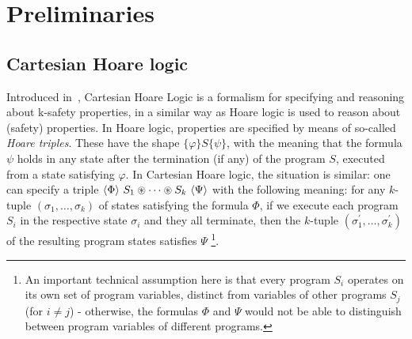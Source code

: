 \section{Preliminaries}



\subsection{Cartesian Hoare logic}

Introduced in~\cite{SousaD16}, Cartesian Hoare Logic is a formalism for
specifying and reasoning about k-safety properties, in a similar way as Hoare
logic is used to reason about (safety) properties. In Hoare logic, properties are
specified by means of so-called \emph{Hoare triples}.  These have the shape
$\{ \varphi \} S \{ \psi \}$, with the meaning that the formula $\psi$ holds
in any state after the termination (if any) of the program $S$, executed from
a state satisfying $\varphi$.  In Cartesian Hoare logic, the situation is
similar: one can specify a triple
$\langle \Phi \rangle\ S_1 \circledast \cdots \circledast S_k\ \langle \Psi \rangle$ with the
following meaning: for any $k$-tuple $(\sigma_1,\ldots,\sigma_k)$ of states
satisfying the formula $\Phi$, if we execute each program $S_i$ in the
respective state $\sigma_i$ and they all terminate, then the $k$-tuple
$(\sigma_1^\prime,\ldots,\sigma_k^\prime)$ of the resulting program states
satisfies $\Psi$ \footnote{An important technical assumption here is that
  every program $S_i$ operates on its own set of program variables, distinct
  from variables of other programs $S_j$ (for $i \not = j$) - otherwise, the
  formulas $\Phi$ and $\Psi$ would not be able to distinguish between program
  variables of different programs.}.

